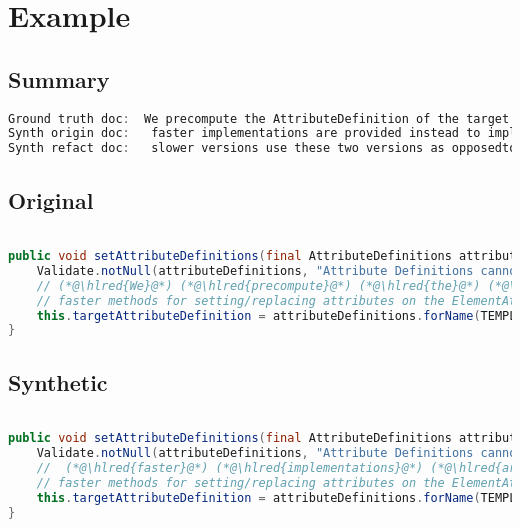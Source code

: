 \documentclass[11pt]{article}
\DeclareRobustCommand{\hlred}[1]{{\sethlcolor{YellowOrange}\hl{#1}}}
\begin{document}
\pagebreak
\section{Example}
\subsection{Summary}

\begin{lstlisting}[language=java]
Ground truth doc:  We precompute the AttributeDefinition of the target attribute in order to being able to use much
Synth origin doc:   faster implementations are provided instead to implement additional and more sophisticated or intuitive or useful but
Synth refact doc:   slower versions use these two versions as opposedto using this class which also defines more
\end{lstlisting}

\subsection{Original}
\begin{lstlisting}[language=java]

public void setAttributeDefinitions(final AttributeDefinitions attributeDefinitions) {
    Validate.notNull(attributeDefinitions, "Attribute Definitions cannot be null");
    // (*@\hlred{We}@*) (*@\hlred{precompute}@*) (*@\hlred{the}@*) (*@\hlred{AttributeDefinition}@*) (*@\hlred{of}@*) (*@\hlred{the}@*) (*@\hlred{target}@*) (*@\hlred{attribute}@*) (*@\hlred{in}@*) (*@\hlred{order}@*) (*@\hlred{to}@*) (*@\hlred{being}@*) (*@\hlred{able}@*) (*@\hlred{to}@*) (*@\hlred{use}@*) (*@\hlred{much}@*)
    // faster methods for setting/replacing attributes on the ElementAttributes implementation
    this.targetAttributeDefinition = attributeDefinitions.forName(TEMPLATE_MODE, TARGET_ATTR_NAME);
}
\end{lstlisting}
\subsection{Synthetic}

\begin{lstlisting}[language=java]

public void setAttributeDefinitions(final AttributeDefinitions attributeDefinitions) {
    Validate.notNull(attributeDefinitions, "Attribute Definitions cannot be null");
    //  (*@\hlred{faster}@*) (*@\hlred{implementations}@*) (*@\hlred{are}@*) (*@\hlred{provided}@*) (*@\hlred{instead}@*) (*@\hlred{to}@*) (*@\hlred{implement}@*) (*@\hlred{additional}@*) (*@\hlred{and}@*) (*@\hlred{more}@*) (*@\hlred{sophisticated}@*) (*@\hlred{or}@*) (*@\hlred{intuitive}@*) (*@\hlred{or}@*) (*@\hlred{useful}@*) (*@\hlred{but}@*)
    // faster methods for setting/replacing attributes on the ElementAttributes implementation
    this.targetAttributeDefinition = attributeDefinitions.forName(TEMPLATE_MODE, TARGET_ATTR_NAME);
}
\end{lstlisting}
\end{document}
